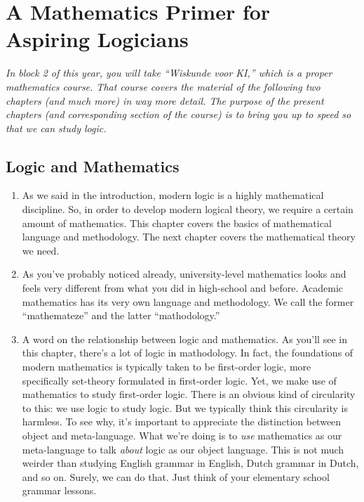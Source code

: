 \chapter{A Mathematics Primer for Aspiring Logicians}

\emph{In block 2 of this year, you will take ``Wiskunde voor KI,'' which is a proper mathematics course. That course covers the material of the following two chapters (and much more) in way more detail. The purpose of the present chapters (and corresponding section of the course) is to bring you up to speed so that we can study logic.}

\section{Logic and Mathematics}

\begin{enumerate}[{\thesection}.1]

	\item As we said in the introduction, modern logic is a highly mathematical discipline. So, in order to develop modern logical theory, we require a certain amount of mathematics. This chapter covers the basics of mathematical language and methodology. The next chapter covers the mathematical theory we need.
	
	\item As you've probably noticed already, university-level mathematics looks and feels very different from what you did in high-school and before. Academic mathematics has its very own language and methodology. We call the former ``mathemateze'' and the latter ``mathodology.'' 
		
	\item A word on the relationship between logic and mathematics. As you'll see in this chapter, there's a lot of logic in mathodology. In fact, the foundations of modern mathematics is typically taken to be first-order logic, more specifically set-theory formulated in first-order logic. Yet, we make use of mathematics to study first-order logic. There is an obvious kind of circularity to this: we use logic to study logic. But  we typically think this circularity is harmless. To see why, it's important to appreciate the distinction between object and meta-language. What we're doing is to \emph{use} mathematics as our meta-language to talk \emph{about} logic as our object language. This is not much weirder than studying English grammar in English, Dutch grammar in Dutch, and so on. Surely, we can do that. Just think of your elementary school grammar lessons. 
		
	\end{enumerate}

